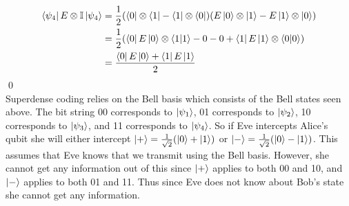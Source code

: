 \begin{align}
    \bra{\psi_4} E \otimes \mathbb{I} \ket{\psi_4} &= \frac{1}{2} ( \bra{0} \otimes \bra{1} - \bra{1} \otimes \bra{0} ) (E \ket{0} \otimes \ket{1} - E \ket{1} \otimes \ket{0})\\
    &= \frac{1}{2} ( \bra{0} E \ket{0} \otimes \bra{1}\ket{1} - 0 - 0 + \bra{1}E \ket{1} \otimes \bra{0}\ket{0})\\
    &=\frac{\bra{0} E \ket{0} + \bra{1} E \ket{1}}{2}
\end{align}
\qed\\
Superdense coding relies on the Bell basis which consists of the Bell states seen above. The bit string 00 corresponds to $\ket{\psi_1}$, 01 corresponds to $\ket{\psi_2}$, 10 corresponds to $\ket{\psi_3}$, and 11 corresponds to $\ket{\psi_4}$. So if Eve intercepts Alice's qubit she will either intercept $\ket{+} = \frac{1}{\sqrt{2}} (\ket{0} + \ket{1})$ or $\ket{-} = \frac{1}{\sqrt{2}} (\ket{0} - \ket{1})$. This assumes that Eve knows that we transmit using the Bell basis. However, she cannot get any information out of this since $\ket{+}$ applies to both 00 and 10, and $\ket{-}$ applies to both 01 and 11. Thus since Eve does not know about Bob's state she cannot get any information.